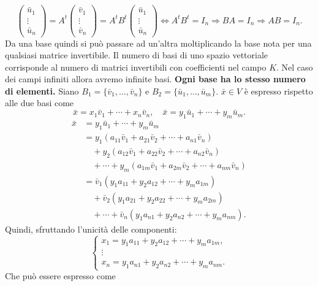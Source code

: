 \documentclass[11pt,a4paper]{article}
\newcommand{\pagina}[1]{\clearpage}
\begin{document}
\[\begin{pmatrix}\bar u_1\\\vdots\\\bar u_n\end{pmatrix}=A^t\begin{pmatrix}\bar v_1\\\vdots\\\bar v_n\end{pmatrix}=A^tB^t\begin{pmatrix}\bar u_1\\\vdots\\\bar u_n\end{pmatrix}\Longleftrightarrow A^tB^t=I_n\Rightarrow BA=I_n\Rightarrow AB=I_n.\]
\pagina{33}
Da una base quindi si può passare ad un'altra moltiplicando la base nota per una qualsiasi matrice invertibile.
Il numero di basi di uno spazio vettoriale corrisponde al numero di matrici invertibili con coefficienti nel campo $K$. Nel caso dei campi infiniti allora avremo infinite basi.
\textbf{Ogni base ha lo stesso numero di elementi.}
Siano $B_1=\{\bar v_1,\ldots,\bar v_n\}$ e $B_2=\{\bar u_1,\ldots,\bar u_m\}$. $\bar x\in V$ è espresso rispetto alle due basi come
\[\bar x=x_1\bar v_1+\cdots+x_n\bar v_n,\quad\bar x=y_1\bar u_1+\cdots+y_m\bar u_m.\]
\[\begin{aligned}\bar x&=y_1\bar u_1+\cdots+y_m\bar u_m\\&=y_1(a_{11}\bar v_1+a_{21}\bar v_2+\cdots+a_{n1}\bar v_n)\\&\quad+y_2(a_{12}\bar v_1+a_{22}\bar v_2+\cdots+a_{n2}\bar v_n)\\&\quad+\cdots+y_m(a_{1m}\bar v_1+a_{2m}\bar v_2+\cdots+a_{nm}\bar v_n)\\&=\bar v_1(y_1a_{11}+y_2a_{12}+\cdots+y_ma_{1m})\\&\quad+\bar v_2(y_1a_{21}+y_2a_{22}+\cdots+y_ma_{2m})\\&\quad+\cdots+\bar v_n(y_1a_{n1}+y_2a_{n2}+\cdots+y_ma_{nm}).\end{aligned}\]
Quindi, sfruttando l'unicità delle componenti:
\[\begin{cases}x_1=y_1a_{11}+y_2a_{12}+\cdots+y_ma_{1m},\\\vdots\\x_n=y_1a_{n1}+y_2a_{n2}+\cdots+y_ma_{nm}.\end{cases}\]
\pagina{34}
Che può essere espresso come
\end{document}
